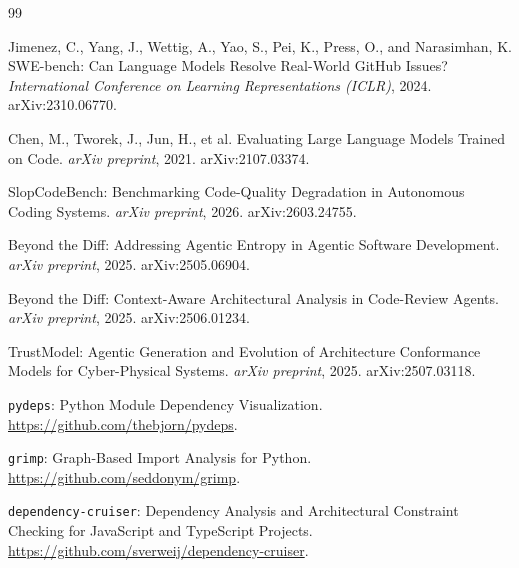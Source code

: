 \documentclass[11pt]{article}
\begin{document}
\begin{thebibliography}{99}

Jimenez, C., Yang, J., Wettig, A., Yao, S., Pei, K., Press, O., and Narasimhan, K.
\newblock
SWE-bench: Can Language Models Resolve Real-World GitHub Issues?
\newblock
\emph{International Conference on Learning Representations (ICLR)}, 2024.
\newblock
arXiv:2310.06770.

Chen, M., Tworek, J., Jun, H., et al.
\newblock
Evaluating Large Language Models Trained on Code.
\newblock
\emph{arXiv preprint}, 2021.
\newblock
arXiv:2107.03374.

SlopCodeBench: Benchmarking Code-Quality Degradation in Autonomous Coding Systems.
\newblock
\emph{arXiv preprint}, 2026.
\newblock
arXiv:2603.24755.

Beyond the Diff: Addressing Agentic Entropy in Agentic Software Development.
\newblock
\emph{arXiv preprint}, 2025.
\newblock
arXiv:2505.06904.

Beyond the Diff: Context-Aware Architectural Analysis in Code-Review Agents.
\newblock
\emph{arXiv preprint}, 2025.
\newblock
arXiv:2506.01234.

TrustModel: Agentic Generation and Evolution of Architecture Conformance
Models for Cyber-Physical Systems.
\newblock
\emph{arXiv preprint}, 2025.
\newblock
arXiv:2507.03118.

\texttt{pydeps}: Python Module Dependency Visualization.
\newblock
\url{https://github.com/thebjorn/pydeps}.

\texttt{grimp}: Graph-Based Import Analysis for Python.
\newblock
\url{https://github.com/seddonym/grimp}.

\texttt{dependency-cruiser}: Dependency Analysis and Architectural Constraint
Checking for JavaScript and TypeScript Projects.
\newblock
\url{https://github.com/sverweij/dependency-cruiser}.

\end{thebibliography}

\end{document}
